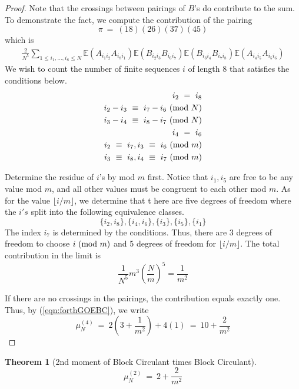\documentclass[12pt,reqno]{amsart}
\theoremstyle{plain} %
\newtheorem{theorem}{Theorem}[section]
\theoremstyle{remark}
\theoremstyle{definition}
\renewcommand{\mod}[1]{\textup{ (mod~$#1$)}}
\begin{document}
\begin{proof}
Note that the crossings between pairings of $B$'s do contribute to the sum. 
To demonstrate the fact, we compute the contribution of the pairing 
\[
    \pi \ = \ (18)(26)(37)(45)
\] which is 
\begin{equation}
    \begin{split}
\frac{2}{N^5} \sum_{1 \leq i_1, \dots,  i_8 \leq N} 
\mathbb{E} \left( A_{i_1i_2} A_{i_8i_1}\right)
\mathbb{E}
\left(B_{i_2i_3} B_{i_6i_7}\right) 
\mathbb{E}
\left(B_{i_3i_4} B_{i_7i_8}  \right)
\mathbb{E}
\left(
A_{i_4i_5} A_{i_5i_6}  
\right)
    \end{split}
\end{equation}
We wish to count the number of finite sequences $i$ of length 
8 that satisfies the conditions below. 
\begin{eqnarray}
i_2 \ = \ i_8 \\
i_2 - i_3 \ \equiv \ i_7 - i_6 \mod N\\ 
i_3 - i_4 \ \equiv \ i_8 - i_7 \mod N\\
i_4 \ = \ i_6 \\ 
i_2 \ \equiv \ i_7, i_3 \ \equiv \ i_6 \mod m \\ 
i_3 \ \equiv \ i_8, i_4 \ \equiv \ i_7 \mod m
\end{eqnarray}

Determine the residue of $i$'s by mod $m$ first. Notice that $i_1, i_5$ 
are free to be any value mod $m$, and all other values must be congruent 
to each other mod $m$. As for the value $\lfloor i/m\rfloor$, we determine that t
here are five degrees of freedom where the $i's$ split into the following 
equivalence classes. 
\[
\{
    i_2, i_8\}, \{i_4, i_6\}, \{i_3\}, \{i_5\}, \{i_1\}
\]
The index $i_7$ is determined by the conditions. 
Thus, there are 3 degrees of freedom to choose $i \mod m$ and 
5 degrees of freedom for $\lfloor i/m \rfloor$. The total contribution 
in the limit is 
\[
    \frac 1 {N^5}m^3 \left(
        \frac N m
    \right)^5 = \frac 1 {m^2}
\]  

If there are no crossings in the pairings, the contribution equals exactly one. 
Thus, by (\ref{eqn:forthGOEBC}), we write 
\[
    \mu_N^{(4)} \ = \ 2 \left(3 + \frac 1{m^2}\right) + 4(1) \ = \ 10 + \frac 2 {m^2}
\]

\end{proof}

\begin{theorem}[2nd moment of Block Circulant times Block Circulant]
    \[
        \mu_N^{(2)} \ =\ 2 + \frac 2 {m^2} 
    \]
\end{theorem}
\end{document}
